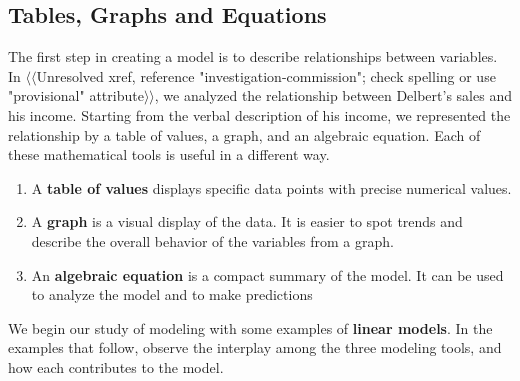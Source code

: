 \documentclass[10pt,]{book}
\newcommand{\terminology}[1]{\textbf{#1}}
\theoremstyle{plain}
\theoremstyle{definition}
\theoremstyle{definition}
\theoremstyle{definition}
\numberwithin{equation}{part}
\begin{document}
\subsection[{Tables, Graphs and Equations}]{Tables, Graphs and Equations}\label{subsection-1}
The first step in creating a model is to describe relationships between variables.  In {$\langle\langle$Unresolved xref, reference "investigation-commission"; check spelling or use "provisional" attribute$\rangle\rangle$}, we analyzed the relationship between Delbert's sales and his income.  Starting from the verbal description of his income, we represented the relationship by a table of values, a graph, and an algebraic equation.  Each of these mathematical tools is useful in a different way.%
\leavevmode%
\begin{enumerate}
\item\hypertarget{li-1}{}A \terminology{table of values} displays specific data points with precise numerical values.%
\item\hypertarget{li-2}{}A \terminology{graph} is a visual display of the data.  It is easier to spot trends and describe the overall behavior of the variables from a graph.%
\item\hypertarget{li-3}{}An \terminology{algebraic equation} is a compact summary of the model.  It can be used to analyze the model and to make predictions%
\end{enumerate}
\par
We begin our study of modeling with some examples of \terminology{linear models}.  In the examples that follow, observe the interplay among the three modeling tools, and how each contributes to the model.%
\end{document}
